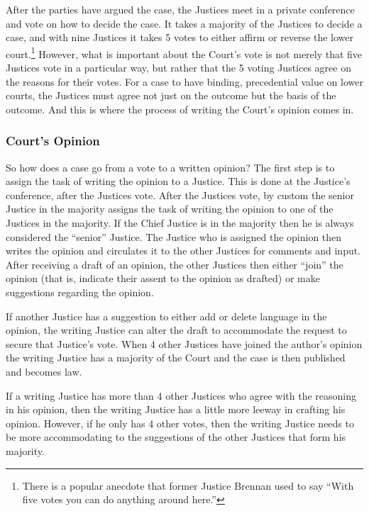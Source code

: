 After the parties have argued the case, the Justices meet in a private conference and vote on how to decide the case.
It takes a majority of the Justices to decide a case, and with nine Justices it takes 5 votes to either affirm or reverse the lower court.\footnote{There is a popular anecdote that former Justice Brennan used to say ``With five votes you can do anything around here.''}  However, what is important about the Court's vote is not merely that five Justices vote in a particular way, but rather that the 5 voting Justices agree on the reasons for their votes.  For a case to have binding, precedential value on lower courts, the Justices must agree not just on the outcome but the basis of the outcome.  And this is where the process of writing the Court's opinion comes in.

\subsubsection{Court's Opinion}
So how does a case go from a vote to a written opinion?  The first step is to assign the task of writing the opinion to a Justice.  This is done at the Justice's conference, after the Justices vote.  After the Justices vote, by custom the senior Justice in the majority assigns the task of writing the opinion to one of the Justices in the majority.  If the Chief Justice is in the majority then he is always considered the “senior” Justice.  The Justice who is assigned the opinion then writes the opinion and circulates it to the other Justices for comments and input.  After receiving a draft of an opinion, the other Justices then either ``join'' the opinion (that is, indicate their assent to the opinion as drafted) or make suggestions regarding the opinion.

If another Justice has a suggestion to either add or delete language in the opinion, the writing Justice can alter the draft to accommodate the request to secure that Justice's vote.  When 4 other Justices have joined the author's opinion the writing Justice has a majority of the Court and the case is then published and becomes law.

If a writing Justice has more than 4 other Justices who agree with the reasoning in his opinion, then the writing Justice has a little more leeway in crafting his opinion.  
However, if he only has 4 other votes, then the writing Justice needs to be more accommodating to the suggestions of the other Justices that form his majority.



